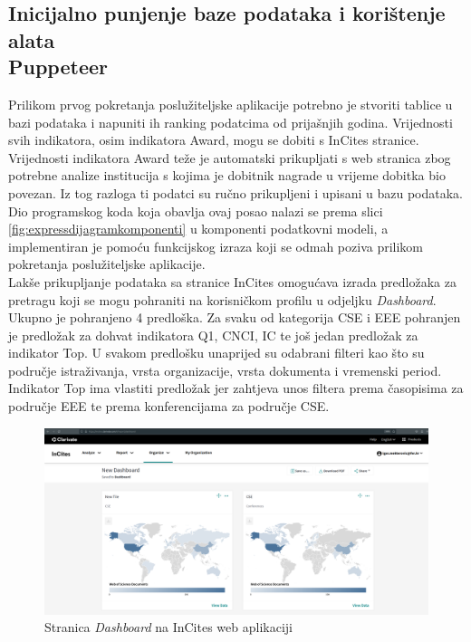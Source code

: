 \documentclass[times, utf8, zavrsni]{fer}
\begin{document}
\subsection{Inicijalno punjenje baze podataka i korištenje alata\\ Puppeteer}
Prilikom prvog pokretanja poslužiteljske aplikacije potrebno je stvoriti tablice u bazi podataka i napuniti ih ranking podatcima od prijašnjih godina.
Vrijednosti svih indikatora, osim indikatora Award, mogu se dobiti s InCites stranice. Vrijednosti indikatora Award teže je automatski prikupljati 
s web stranica zbog potrebne analize institucija s kojima je dobitnik nagrade u vrijeme dobitka bio povezan. Iz tog razloga ti podatci 
su ručno prikupljeni i upisani u bazu podataka. 
\\Dio programskog koda koja obavlja ovaj posao nalazi se prema slici \ref{fig:expressdijagramkomponenti} u komponenti podatkovni modeli, a 
implementiran je pomoću funkcijskog izraza koji se odmah poziva  prilikom pokretanja 
poslužiteljske aplikacije. \\Lakše prikupljanje podataka sa stranice InCites omogućava izrada predložaka za pretragu koji se mogu pohraniti 
na korisničkom profilu u odjeljku \emph{Dashboard}. Ukupno je pohranjeno 4 predloška. Za svaku od kategorija CSE i EEE pohranjen je predložak 
za dohvat indikatora Q1, CNCI, IC te još jedan predložak za indikator Top. U svakom predlošku unaprijed su odabrani filteri kao što su područje istraživanja,
vrsta organizacije, vrsta dokumenta i vremenski period. Indikator Top ima vlastiti predložak jer zahtjeva unos filtera prema časopisima za područje EEE te 
prema konferencijama za područje CSE. 
\begin{figure}[htb]
    \hspace*{-2cm} 
       \includegraphics[scale=0.21]{dashboard.png} 
       \caption{Stranica \emph{Dashboard} na InCites web aplikaciji}
       \label{fig:dashboard}
       \end{figure} 
\end{document}
